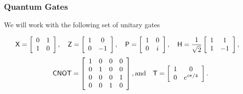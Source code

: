 \begin{definition}


\subsubsection{Quantum Gates}
We will work with the following set of unitary gates

$${\sf X} = \left[\begin{array}{cc} 0 & 1\\ 1 & 0\end{array}\right],
\quad{\sf Z} = \left[\begin{array}{cc} 1 & 0\\ 0 & -1\end{array}\right],
\quad{\sf P} = \left[\begin{array}{cc} 1 & 0\\ 0 & i\end{array}\right],
 \quad{\sf H} = \frac{1}{\sqrt{2}}\left[\begin{array}{cc}1 & 1\\1 & -1\end{array}\right], $$
$$\quad{\sf CNOT} = \left[\begin{array}{cccc} 1 & 0 & 0 & 0\\ 0 & 1 & 0 & 0\\ 0 & 0 & 0 & 1\\ 0 & 0 & 1 & 0\end{array}\right], \text{and}
\quad{\sf T} = \left[\begin{array}{cc} 1 & 0\\ 0 & e^{i\pi/4}\end{array}\right].$$


\end{definition}
